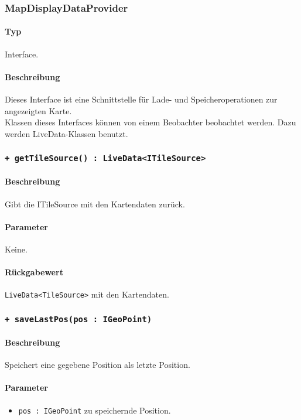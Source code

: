\subsubsection{MapDisplayDataProvider}
\paragraph*{Typ}
Interface.
\paragraph*{Beschreibung}
Dieses Interface ist eine Schnittstelle für Lade- und Speicheroperationen zur angezeigten Karte.\\
Klassen dieses Interfaces können von einem Beobachter beobachtet werden. Dazu werden 
LiveData-Klassen benutzt.

\subsubsection*{\texttt{+ getTileSource() : LiveData<ITileSource>}}%
\paragraph*{Beschreibung}
Gibt die ITileSource mit den Kartendaten zurück.
\paragraph*{Parameter}
Keine.
\paragraph*{Rückgabewert}
\texttt{LiveData<TileSource>} mit den Kartendaten.

\subsubsection*{\texttt{+ saveLastPos(pos : IGeoPoint)}}%
\paragraph*{Beschreibung}
Speichert eine gegebene Position als letzte Position.
\paragraph*{Parameter}
\begin{itemize}
    \item \texttt{pos : IGeoPoint} zu speichernde Position.
\end{itemize}
